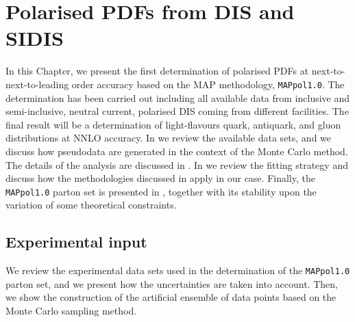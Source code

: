 \chapter{Polarised PDFs from DIS and SIDIS}
\label{ch:4}

In this Chapter, we present the first determination of polarised PDFs at next-to-next-to-leading order accuracy based on the MAP methodology, \texttt{MAPpol1.0}. The determination has been carried out including all available data from inclusive and semi-inclusive, neutral current, polarised DIS coming from different facilities. The final result will be a determination of light-flavours quark, antiquark, and gluon distributions at NNLO accuracy. In  we review the available data sets, and we discuss how pseudodata are generated in the context of the Monte Carlo method. The details of the analysis are discussed in . In  we review the fitting strategy and discuss how the methodologies discussed in  apply in our case. Finally, the \texttt{MAPpol1.0} parton set is presented in , together with its stability upon the variation of some theoretical constraints.

\section{Experimental input}
\label{sec:4.1}

We review the experimental data sets used in the determination of the \texttt{MAPpol1.0} parton set, and we present how the uncertainties are taken into account. Then, we show the construction of the artificial ensemble of data points based on the Monte Carlo sampling method.

